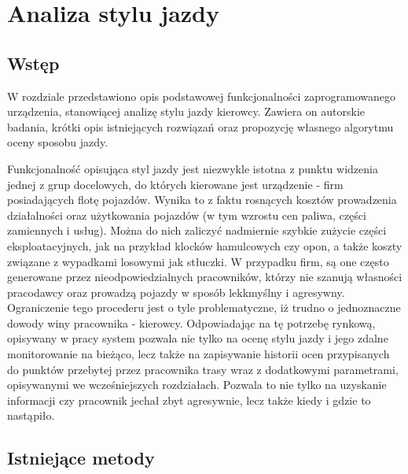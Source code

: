 \chapter{Analiza stylu jazdy}

\section{Wstęp}

W rozdziale przedstawiono opis podstawowej funkcjonalności zaprogramowanego urządzenia, stanowiącej analizę stylu jazdy kierowcy. Zawiera on autorskie badania, krótki opis istniejących rozwiązań oraz propozycję własnego algorytmu oceny sposobu jazdy. 

Funkcjonalność opisująca styl jazdy jest niezwykle istotna z punktu widzenia jednej z grup docelowych, do których kierowane jest urządzenie - firm posiadających flotę pojazdów. Wynika to z faktu rosnących kosztów prowadzenia działalności oraz użytkowania pojazdów (w tym wzrostu cen paliwa, części zamiennych i usług). Można do nich zaliczyć nadmiernie szybkie zużycie części eksploatacyjnych, jak na przykład klocków hamulcowych czy opon, a także koszty związane z wypadkami losowymi jak stłuczki. W przypadku firm, są one często generowane przez nieodpowiedzialnych pracowników, którzy nie szanują własności pracodawcy oraz prowadzą pojazdy w sposób lekkmyślny i agresywny. Ograniczenie tego procederu jest o tyle problematyczne, iż trudno o jednoznaczne dowody winy pracownika - kierowcy. Odpowiadając na tę potrzebę rynkową, opisywany w pracy system pozwala nie tylko na ocenę stylu jazdy i jego zdalne monitorowanie na bieżąco, lecz także na zapisywanie historii ocen przypisanych do punktów przebytej przez pracownika trasy wraz z dodatkowymi parametrami, opisywanymi we wcześniejszych rozdziałach. Pozwala to nie tylko na uzyskanie informacji czy pracownik jechał zbyt agresywnie, lecz także kiedy i gdzie to nastąpiło.

\clearpage
\section{Istniejące metody}

